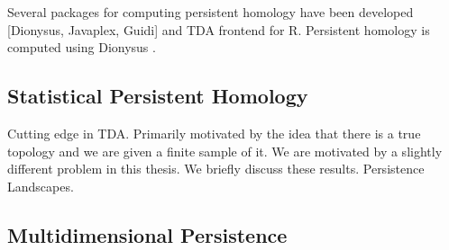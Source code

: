 Several packages for computing persistent homology have been developed [Dionysus, Javaplex, Guidi] and TDA frontend for R.
Persistent homology is computed using Dionysus \cite{Morozov:2012}.

\subsection{Statistical Persistent Homology}

Cutting edge in TDA.
Primarily motivated by the idea that there is a true topology and we are given a finite sample of it.
We are motivated by a slightly different problem in this thesis.
We briefly discuss these results.
Persistence Landscapes.

\subsection{Multidimensional Persistence}
\subsection{}

